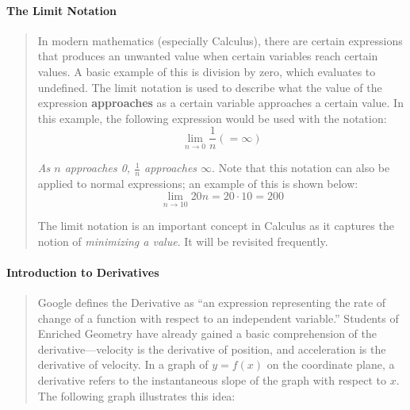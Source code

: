 \documentclass[letterpaper,12pt,twoside]{report}
\begin{document}
	\paragraph{The Limit Notation}
	\begin{quotation}
		In modern mathematics (especially Calculus), there are certain expressions that produces an unwanted value when certain variables reach certain values. A basic example of this is division by zero, which evaluates to undefined. The limit notation is used to describe what the value of the expression \textbf{approaches} as a certain variable approaches a certain value. In this example, the following expression would be used with the notation: $$\lim_{n\to 0} \frac{1}{n}(=\infty)$$
		
		\textit{As $n$ approaches 0, $\frac{1}{n}$ approaches $\infty$}. Note that this notation can also be applied to normal expressions; an example of this is shown below: $$\lim_{n \to 10} 20n=20\cdot10=200$$
		
		The limit notation is an important concept in Calculus as it captures the notion of \textit{minimizing a value}. It will be revisited frequently.
	\end{quotation}

	\paragraph{Introduction to Derivatives}
	\begin{quotation}
	Google defines the Derivative as ``an expression representing the rate of change of a function with respect to an independent variable.'' Students of Enriched Geometry have already gained a basic comprehension of the derivative---velocity is the derivative of position, and acceleration is the derivative of velocity. In a graph of $y=f(x)$ on the coordinate plane, a derivative refers to the instantaneous slope of the graph with respect to $x$. The following graph illustrates this idea:
	\begin{center}
	\end{center}
\end{quotation}
\end{document}
